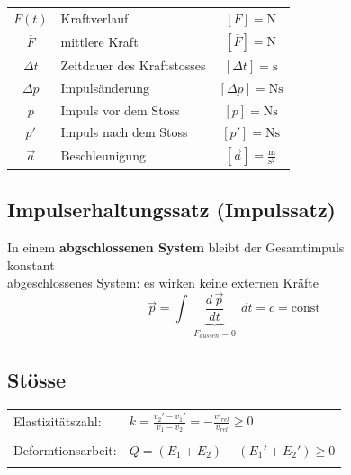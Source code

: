 	\begin{tabular}{c l c}
	$F(t)$ & Kraftverlauf & $[F] = \mathrm{N}$ \\
	$\overline{F}$ & mittlere Kraft & $[\overline{F}] = \mathrm{N}$ \\
	$\Delta t$ & Zeitdauer des Kraftstosses & $[\Delta t] = \mathrm{s}$ \\
	$\Delta p$ & Impulsänderung & $[\Delta p] = \mathrm{Ns}$ \\
	$p$ & Impuls vor dem Stoss & $[p] = \mathrm{Ns}$ \\
	$p'$ & Impuls nach dem Stoss & $[p'] = \mathrm{Ns}$ \\
	$\vec{a}$ & Beschleunigung & $[\vec{a}] = \mathrm{\frac{m}{s^2}}$ \\
	\end{tabular}
	
	

	
	
	\subsection{Impulserhaltungssatz (Impulssatz)}
	In einem \textbf{abgschlossenen System} bleibt der Gesamtimpuls \\
    konstant \\
	abgeschlossenes System: es wirken keine externen Kräfte \\
	
	$$ \boxed{ \vec{p} =  \int \underbrace{  \frac{d \, \vec{p}}{dt} }_{\substack{F_{aussen} = 0}}   \, dt = c = \text{const} }  $$



	\vfill\null
	\columnbreak



	\subsection{Stösse}
	
	\begin{tabular}{ll}
	Elastizitätszahl: & $k = \frac{v_2' - v_1'}{v_1 - v_2} = - \frac{v'_{rel}}{v_{rel}} \geq 0$ \\
	\\
	Deformtionsarbeit: & $Q = (E_1 + E_2) - (E_1' + E_2') \geq 0$  \\
	\\
	\end{tabular}
	

